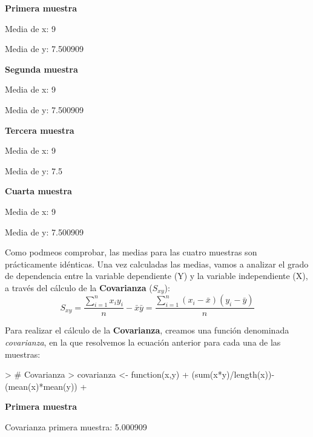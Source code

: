 \documentclass [a4paper] {article}
\begin{document}
\textbf{Primera muestra}
\begin{Schunk}
\begin{Soutput}
Media de x:  9
\end{Soutput}
\begin{Soutput}
Media de y:  7.500909
\end{Soutput}
\end{Schunk}

\textbf{Segunda muestra}
\begin{Schunk}
\begin{Soutput}
Media de x:  9
\end{Soutput}
\begin{Soutput}
Media de y:  7.500909
\end{Soutput}
\end{Schunk}

\textbf{Tercera muestra}
\begin{Schunk}
\begin{Soutput}
Media de x:  9
\end{Soutput}
\begin{Soutput}
Media de y:  7.5
\end{Soutput}
\end{Schunk}

\textbf{Cuarta muestra}
\begin{Schunk}
\begin{Soutput}
Media de x:  9
\end{Soutput}
\begin{Soutput}
Media de y:  7.500909
\end{Soutput}
\end{Schunk}

Como podmeos comprobar, las medias para las cuatro muestras son prácticamente idénticas.
Una vez calculadas las medias, vamos a analizar el grado de dependencia entre la variable dependiente (Y)
y la variable independiente (X), a través del cálculo de la \textbf{Covarianza} (\textit{$S_{xy}$}):
\begin{equation*}
S_{xy} = \frac{\sum_{i=1}^{n} x_i y_i}{n} - \bar{x}\bar{y} = \frac{\sum_{i=1}^{n} (x_i-\bar{x}) (y_i-\bar{y})}{n}
\end{equation*}

Para realizar el cálculo de la \textbf{Covarianza}, creamos una función denominada \textit{covarianza},
en la que resolvemos la ecuación anterior para cada una de las muestras:
\begin{Schunk}
\begin{Sinput}
> # Covarianza
> covarianza <- function(x,y){
+   (sum(x*y)/length(x))-(mean(x)*mean(y))
+ }
\end{Sinput}
\end{Schunk}
\newpage
\textbf{Primera muestra}
\begin{Schunk}
\begin{Soutput}
Covarianza primera muestra:  5.000909
\end{Soutput}
\end{Schunk}
\end{document}
